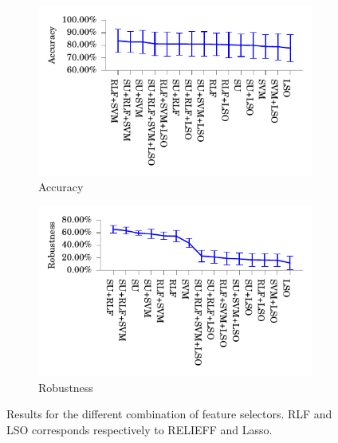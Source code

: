 \documentclass[twoside,11pt]{article}
\begin{document}
\begin{figure}[!t]
\centering
\begin{subfigure}{.5\textwidth}
  \centering
  \includegraphics[width=1.07\textwidth]{images/Accuracy_of_the_different_combinations.pdf}
  \caption{Accuracy}
  \label{fig:combination_accuracy}
\end{subfigure}%
\begin{subfigure}{.5\textwidth}
  \centering
  \includegraphics[width=1.07\textwidth]{images/Robustness_of_the_different_combinations.pdf}
  \caption{Robustness}
  \label{fig:combination_robustness}
\end{subfigure}
\caption{Results for the different combination of feature selectors. RLF and LSO corresponds respectively to RELIEFF and Lasso.}
\label{fig:combination_results}
\end{figure}
\end{document}
